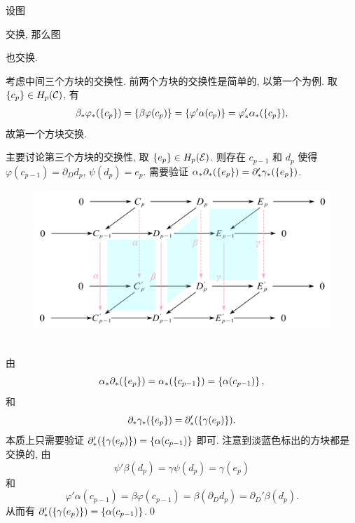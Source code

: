 \begin{Theorem}
	设图
	\begin{center}
	\end{center}
	交换, 那么图
	\begin{center}
	\end{center}
	也交换.
\end{Theorem}
\begin{Proof}
	考虑中间三个方块的交换性. 前两个方块的交换性是简单的, 以第一个为例. 取 $ \left\{ c_p \right\}\in H_p(\mathcal{C}) $, 有
	\[
		\beta_*\varphi_*(\left\{ c_p \right\})=\left\{ \beta\varphi(c_p) \right\}=\left\{ \varphi'\alpha(c_p) \right\}=\varphi_*'\alpha_*(\left\{ c_p \right\}),
	\]
	故第一个方块交换.

	主要讨论第三个方块的交换性, 取 $ \left\{ e_p \right\}\in H_p(\mathcal{E}) $. 则存在 $ c_{p-1} $ 和 $ d_p $ 使得 $ \varphi(c_{p-1})=\partial_D d_p $, $ \psi(d_p)=e_p $. 需要验证 $ \alpha_*\partial_*(\left\{ e_p \right\})=\partial_*'\gamma_*(\left\{ e_p \right\}) $.
	\begin{figure}[htbp]
		\centering
		\includegraphics[width=0.55\linewidth]{figures/Sec8-4.png}
	\end{figure}\\
	由
	\[
		\alpha_*\partial_*(\left\{ e_p \right\})=\alpha_*(\left\{ c_{p-1} \right\})=\left\{ \alpha(c_{p-1}) \right\},
	\]
	和
	\[
		\partial_*\gamma_*(\left\{ e_p \right\})=\partial_*'(\left\{ \gamma(e_p) \right\}).
	\]
	本质上只需要验证 $ \partial_*'(\left\{ \gamma(e_p) \right\})=\left\{ \alpha(c_{p-1}) \right\} $ 即可. 注意到淡蓝色标出的方块都是交换的, 由
	\[
		\psi'\beta(d_p)=\gamma\psi(d_p)=\gamma(e_p)
	\]
	和
	\[
		\varphi'\alpha(c_{p-1})=\beta\varphi(c_{p-1})=\beta(\partial_D d_p)=\partial_D'\beta(d_p).
	\]
	从而有 $ \partial_*'(\left\{ \gamma(e_p) \right\})=\left\{ \alpha(c_{p-1}) \right\} $.\qed
\end{Proof}

